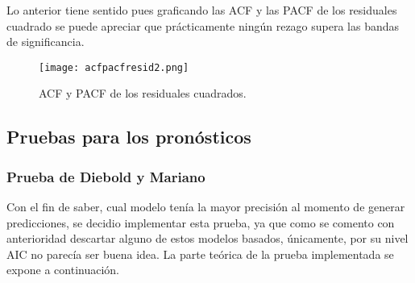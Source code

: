 \documentclass{article}
\theoremstyle{remark}
\begin{document}
Lo anterior tiene sentido pues graficando las ACF y las PACF de los residuales cuadrado se puede apreciar que prácticamente ningún rezago supera las bandas de significancia.
\begin{figure}[H]
    \centering
    \texttt{[image: acfpacfresid2.png]}
    \caption{ACF y PACF de los residuales cuadrados.}
    \label{fig:ACFyPACFRES2}
\end{figure}


\subsection{Pruebas para los pronósticos}

\subsubsection{Prueba de Diebold y Mariano} 
Con el fin de saber, cual modelo tenía la mayor precisión al momento de generar predicciones, se decidio implementar esta prueba, ya que como se comento con anterioridad descartar alguno de estos modelos basados, únicamente, por su nivel AIC no parecía ser buena idea. La parte teórica de la prueba implementada se expone a continuación.\\
\end{document}

